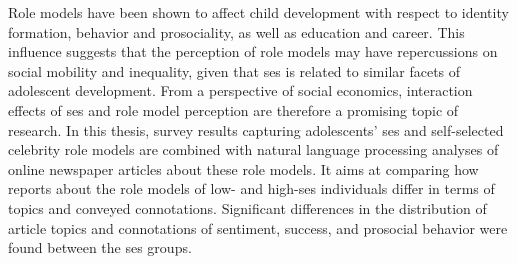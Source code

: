 Role models have been shown to affect child development with respect to identity formation, behavior and prosociality, as well as education and career. 
This influence suggests that the perception of role models may have repercussions on social mobility and inequality, given that \gls{ses} is related to similar facets of adolescent development.
From a perspective of social economics, interaction effects of \gls{ses} and role model perception are therefore a promising topic of research.
In this thesis, survey results capturing adolescents' \gls{ses} and self-selected celebrity role models are combined with natural language processing analyses of online newspaper articles about these role models. It aims at comparing how reports about the role models of low- and high-\gls{ses} individuals differ in terms of topics and conveyed connotations. Significant differences in the distribution of article topics and connotations of sentiment, success, and prosocial behavior were found between the \gls{ses} groups.


\glsresetall